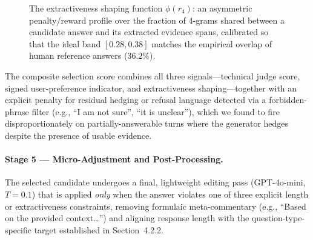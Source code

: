 \begin{figure}[h]
\centering
{}
\caption{The extractiveness shaping function $\phi(r_4)$: an asymmetric penalty/reward profile over the fraction of $4$-grams shared between a candidate answer and its extracted evidence spans, calibrated so that the ideal band $[0.28, 0.38]$ matches the empirical overlap of human reference answers ($36.2\%$).}
\label{fig:extractiveness-en}
\end{figure}

The composite selection score combines all three signals---technical judge score, signed user-preference indicator, and extractiveness shaping---together with an explicit penalty for residual hedging or refusal language detected via a forbidden-phrase filter (e.g., ``I am not sure'', ``it is unclear''), which we found to fire disproportionately on partially-answerable turns where the generator hedges despite the presence of usable evidence.

\paragraph{Stage 5 --- Micro-Adjustment and Post-Processing.}
The selected candidate undergoes a final, lightweight editing pass (GPT-4o-mini, $T{=}0.1$) that is applied \emph{only} when the answer violates one of three explicit length or extractiveness constraints, removing formulaic meta-commentary (e.g., ``Based on the provided context\dots'') and aligning response length with the question-type-specific target established in Section~4.2.2.

